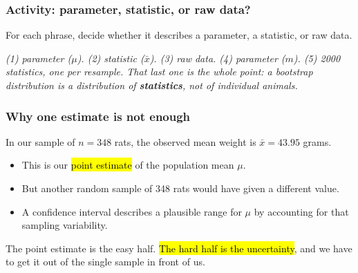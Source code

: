 \documentclass[slidestop,compress,mathserif]{beamer}
\newcommand{\soln}[1]{\textit{#1}}
\begin{document}

\begin{frame}
\frametitle{Activity: parameter, statistic, or raw data?}

For each phrase, decide whether it describes a parameter, a statistic, or raw data.


\pause
\vspace{-0.4em}
{\footnotesize
\soln{(1) parameter ($\mu$). (2) statistic ($\bar{x}$). (3) raw data. (4) parameter ($m$). (5) 2000 \emph{statistics}, one per resample. That last one is the whole point: a bootstrap distribution is a distribution of \textbf{statistics}, not of individual animals.}}

\end{frame}


\begin{frame}
\frametitle{Why one estimate is not enough}

In our sample of $n=348$ rats, the observed mean weight is $\bar{x}=43.95$ grams.

\begin{itemize}
\item This is our \hl{point estimate} of the population mean $\mu$.
\item But another random sample of 348 rats would have given a different value.
\item A confidence interval describes a plausible range for $\mu$ by accounting for that sampling variability.
\end{itemize}


\vspace{0.1em}
The point estimate is the easy half. \hl{The hard half is the uncertainty}, and we have to get it out of the single sample in front of us.

\end{frame}
\end{document}
